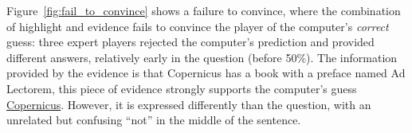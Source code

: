 Figure~\ref{fig:fail_to_convince} shows a failure to convince,
where the combination of highlight and evidence fails to convince the
player of the computer's \emph{correct} guess: three expert players
rejected the computer's prediction and provided different answers,
relatively early in the question (before 50\%). The information
provided by the evidence is that Copernicus has a book with a
preface named Ad Lectorem, this piece of evidence strongly supports the
computer's guess \underline{Copernicus}.  However, it is expressed
differently than the question, with an unrelated but confusing ``not''
in the middle of the sentence.

%
%

